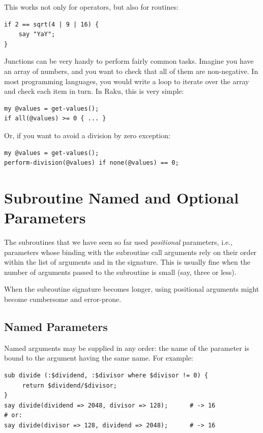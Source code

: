 This works not only for operators, but also for routines:

\begin{verbatim}
if 2 == sqrt(4 | 9 | 16) {
    say "YaY";
}
\end{verbatim}

Junctions can be very handy to perform fairly common tasks. 
Imagine you have an array of numbers, and you want to 
check that all of them are non-negative. In most 
programming languages, you would write a loop to 
iterate over the array and check each item in turn. 
In Raku, this is very simple:

\begin{verbatim}
my @values = get-values();
if all(@values) >= 0 { ... }
\end{verbatim}

Or, if you want to avoid a division by zero exception:

\begin{verbatim}
my @values = get-values();
perform-division(@values) if none(@values) == 0;
\end{verbatim}

\section{Subroutine Named and Optional Parameters}

The subroutines that we have seen so far used \emph{positional} 
parameters, i.e., parameters whose binding with the subroutine 
call arguments rely on their order within the list of 
arguments and in the signature. This is usually fine when 
the number of arguments passed to the subroutine is small 
(say, three or less). 

When the subroutine signature becomes longer, using positional 
arguments might become cumbersome and error-prone. 

\subsection{Named Parameters}

Named arguments may be supplied in any order: the name of 
the parameter is bound to the argument having the same 
name. For example:

\begin{verbatim}
sub divide (:$dividend, :$divisor where $divisor != 0) {
     return $dividend/$divisor;
}
say divide(dividend => 2048, divisor => 128);      # -> 16
# or:
say divide(divisor => 128, dividend => 2048);      # -> 16
\end{verbatim}

